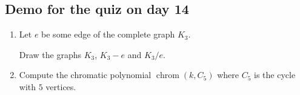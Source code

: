 \documentclass[12pt]{article}
\DeclareMathOperator{\chrom}{chrom}
\begin{document}



\subsection*{Demo for the quiz on day 14}


\begin{enumerate}
    \item Let $e$ be some edge of the complete graph $K_3$. 
    
    Draw the graphs $K_3$, $K_3 - e$ and $K_3/e$.
    \item Compute the chromatic polynomial $\chrom(k, C_5)$ where $C_5$ is the cycle with $5$ vertices.
\end{enumerate}
\end{document}
